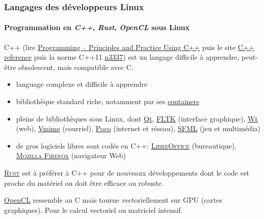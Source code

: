 \documentclass[xcolor=svgnames,final,smaller,a4]{beamer}
\begin{document}
\begin{frame}
  \frametitle{Langages des développeurs Linux}
  \framesubtitle{Programmation en \textit{C++}, \textit{Rust}, \textit{OpenCL} sous Linux}

  C++ (lire
  \href{https://www.stroustrup.com/programming.html}{Programming --
    Principles and Practice Using C++} puis le site
  \href{https://en.cppreference.com/w/cpp}{C++ reference} puis la
  norme C++11
  \href{http://www.open-std.org/jtc1/sc22/wg21/docs/papers/2012/n3337.pdf}{n3337})
  est un langage difficile à apprendre, peut-être obsolescent, mais
  compatible avec C.

  \begin{itemize}
  \item language complexe et difficile à apprendre
  \item bibliothèque standard riche, notamment par ses \href{https://en.cppreference.com/w/cpp/container}{containers}
    \item pleins de bibliothèques sous Linux, dont
      \href{https://qt.io}{Qt}, \href{https://fltk.org/}{FLTK}
      (interface graphique), \href{https://www.webtoolkit.eu/wt}{Wt}
      (web), \href{https://www.vmime.org/}{Vmime} (courriel),
      \href{https://pocoproject.org/}{Poco} (internet et réseau), \href{https://www.sfml-dev.org/}{SFML} (jeu et multimédia)
      \item de gros logiciels libres sont codés en C++:
        \href{http://libreoffice.org/}{\textsc{LibreOffice}}
        (bureautique),
        \href{https://www.mozilla.org/fr/firefox/}{\textsc{Mozilla
            Firefox}} (navigateur Web)
  \end{itemize}

  \href{https://www.rust-lang.org/}{\textsc{Rust}} est à préférer à
  C++ pour de nouveaux développements dont le code est proche du
  matériel ou doit être efficace ou robuste.

  \href{https://fr.wikipedia.org/wiki/OpenCL}{OpenCL} ressemble au C
  mais tourne vectoriellement sur GPU (cartes graphiques). Pour le
  calcul vectoriel ou matriciel intensif.
  
  \end{frame}
\end{document}
